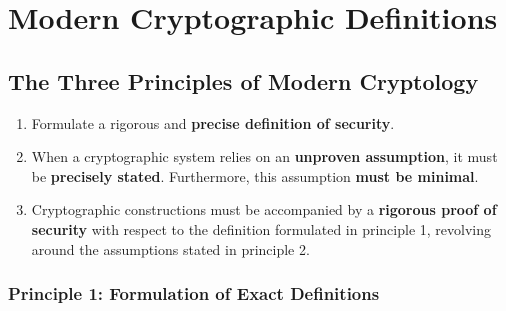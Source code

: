 \chapter{Modern Cryptographic Definitions}


\section{The Three Principles of Modern Cryptology}

\begin{enumerate}
    \item Formulate a rigorous and \textbf{precise definition of security}.
    \item When a cryptographic system relies on an \textbf{unproven assumption}, it must be \textbf{precisely stated}. Furthermore, this assumption \textbf{must be minimal}.
    \item Cryptographic constructions must be accompanied by a \textbf{rigorous proof of security} with respect to the definition formulated in principle 1, revolving around the assumptions stated in principle 2.
\end{enumerate}

\subsection{Principle 1: Formulation of Exact Definitions}

